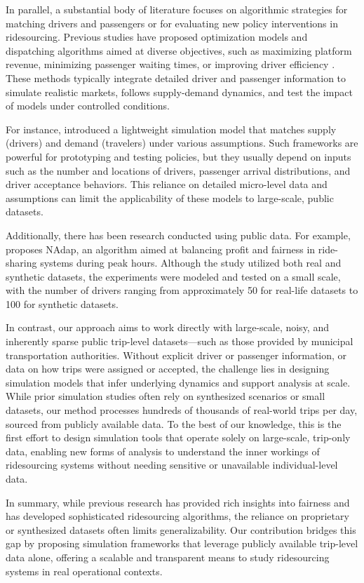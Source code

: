 In parallel, a substantial body of literature focuses on algorithmic strategies for matching drivers and passengers or for evaluating new policy interventions in ridesourcing. Previous studies have proposed optimization models and dispatching algorithms aimed at diverse objectives, such as maximizing platform revenue, minimizing passenger waiting times, or improving driver efficiency \cite{zhang2020pricing, schreieck2016matching, di2013optimization, cao2021optimization}. These methods typically integrate detailed driver and passenger information to simulate realistic markets, follows supply-demand dynamics, and test the impact of models under controlled conditions.

For instance, \cite{kucharski2022simulating} introduced a lightweight simulation model that matches supply (drivers) and demand (travelers) under various assumptions. Such frameworks are powerful for prototyping and testing policies, but they usually depend on inputs such as the number and locations of drivers, passenger arrival distributions, and driver acceptance behaviors. This reliance on detailed micro-level data and assumptions can limit the applicability of these models to large-scale, public datasets.

Additionally, there has been research conducted using public data. For example, \cite{nanda2020balancing} proposes NAdap, an algorithm aimed at balancing profit and fairness in ride-sharing systems during peak hours. Although the study utilized both real and synthetic datasets, the experiments were modeled and tested on a small scale, with the number of drivers ranging from approximately 50 for real-life datasets to 100 for synthetic datasets.

In contrast, our approach aims to work directly with large-scale, noisy, and inherently sparse public trip-level datasets—such as those provided by municipal transportation authorities. Without explicit driver or passenger information, or data on how trips were assigned or accepted, the challenge lies in designing simulation models that infer underlying dynamics and support analysis at scale. While prior simulation studies often rely on synthesized scenarios or small datasets, our method processes hundreds of thousands of real-world trips per day, sourced from publicly available data. To the best of our knowledge, this is the first effort to design simulation tools that operate solely on large-scale, trip-only data, enabling new forms of analysis to understand the inner workings of ridesourcing systems without needing sensitive or unavailable individual-level data.

In summary, while previous research has provided rich insights into fairness and has developed sophisticated ridesourcing algorithms, the reliance on proprietary or synthesized datasets often limits generalizability. Our contribution bridges this gap by proposing simulation frameworks that leverage publicly available trip-level data alone, offering a scalable and transparent means to study ridesourcing systems in real operational contexts. 

